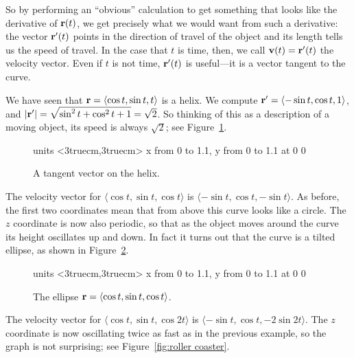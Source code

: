 So by performing an ``obvious'' calculation to get something that
looks like the derivative of ${\bf r}(t)$, we get precisely what we
would want from such a derivative: the vector ${\bf r}'(t)$
points in the direction of travel of the object and its length tells
us the speed of travel. In the case that $t$ is time, then, we call 
${\bf v}(t)={\bf r}'(t)$ the velocity vector. Even if $t$ is not time,
${\bf r}'(t)$ is useful---it is a vector tangent to the curve.

\begin{example}{}{}
We have seen that ${\bf r}=\langle \cos t,\sin t,t\rangle$ is a helix. 
We compute ${\bf r}'=\langle -\sin t,\cos t,1\rangle$, and
$|{\bf r}'|=\sqrt{\sin^2 t+\cos^2 t+1}=\sqrt2$. So thinking of this as
a description of a moving object, its speed is always $\sqrt2$; see
Figure~\ref{fig:helix with tangent}.
\end{example}

\begin{figure}[H]
\centerline{
\vbox{\beginpicture
\normalgraphs
\setcoordinatesystem units <3truecm,3truecm>
\setplotarea x from 0 to 1.1, y from 0 to 1.1
 at 0 0
\endpicture}}
\caption{A tangent vector on the helix. \label{fig:helix with tangent}}
\end{figure}

\begin{example}{}{}
The velocity vector for $\langle \cos t,\sin
t,\cos t\rangle$ is $\langle -\sin t,\cos
t,-\sin t\rangle$. As before, the first two coordinates mean that from
above this curve looks like a circle. The $z$ coordinate is now also
periodic, so that as the object moves around the curve its height
oscillates up and down. In fact it turns out that the curve is a
tilted ellipse, as shown in Figure~\ref{fig:tilted ellipse}.
\end{example}

\begin{figure}[H]
\centerline{
\vbox{\beginpicture
\normalgraphs
\setcoordinatesystem units <3truecm,3truecm>
\setplotarea x from 0 to 1.1, y from 0 to 1.1
 at 0 0
\endpicture}}
\caption{The ellipse ${\bf r}=\langle \cos t,\sin
t,\cos t\rangle$. \label{fig:tilted ellipse}}
\end{figure}

\begin{example}{}{}
The velocity vector for $\langle \cos t,\sin
t,\cos 2t\rangle$ is $\langle -\sin t,\cos
t,-2\sin 2t\rangle$. The $z$ coordinate is now oscillating twice as
fast as in the previous example, so the graph is not surprising; see
Figure~\ref{fig:roller coaster}.
\end{example}

